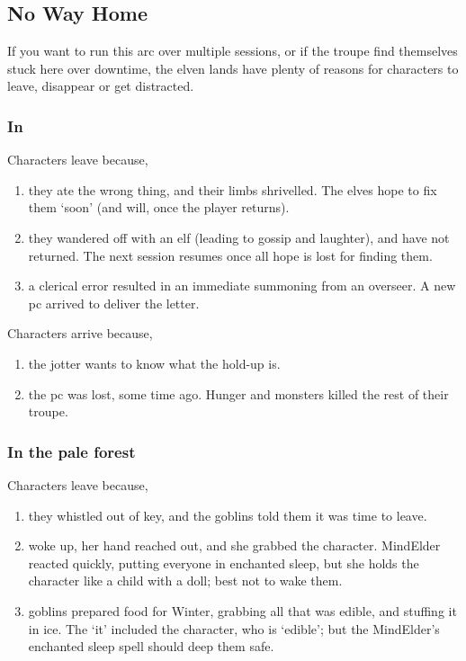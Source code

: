 \begin{multicols}{2}
{  \subsection{No Way Home}

  If you want to run this arc over multiple sessions, or if the troupe find themselves stuck here over \gls{downtime}, the elven lands have plenty of reasons for characters to leave, disappear or get distracted.

  \subsubsection{In }

  Characters leave because,

  \begin{enumerate}
    \item
    they ate the wrong thing, and their limbs shrivelled.
    The elves hope to fix them `soon' (and will, once the player returns).
    \item
    they wandered off with an elf (leading to gossip and laughter), and have not returned.
    The next session resumes once all hope is lost for finding them.
    \item
    a clerical error resulted in an immediate summoning from an overseer.
    A new \gls{pc} arrived to deliver the letter.
  \end{enumerate}

  Characters arrive because,

  \begin{enumerate}
    \item
    the \gls{jotter} wants to know what the hold-up is.
    \item
    the \gls{pc} was lost, some time ago.
    Hunger and monsters killed the rest of their troupe.
  \end{enumerate}

  \subsubsection{In the pale forest}

  Characters leave because,

  \begin{enumerate}
    \item
    they whistled out of key, and the goblins told them it was time to leave.
    \item
     woke up, her hand reached out, and she grabbed the character.
    \gls{MindElder} reacted quickly, putting everyone in enchanted sleep, but she holds the character like a child with a doll; best not to wake them.
    \item
    goblins prepared food for Winter, grabbing all that was edible, and stuffing it in ice.
    The `it' included the character, who is `edible'; but the \gls{MindElder}'s enchanted sleep spell should deep them safe.
  \end{enumerate}

}
\end{multicols}
